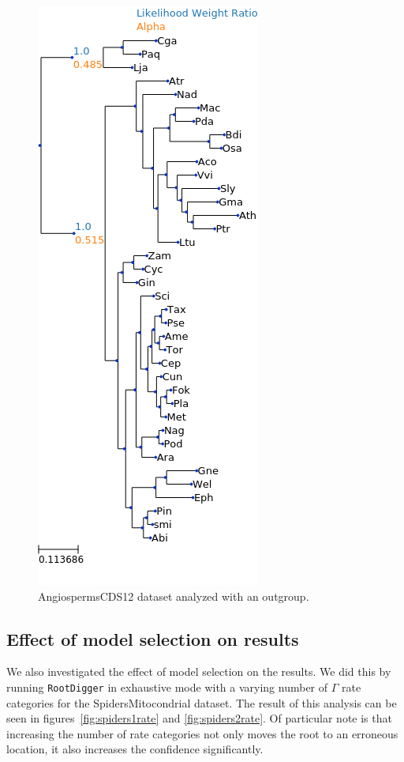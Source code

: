 \documentclass{article}
\newcommand{\RootDiggertt}{\texttt{RootDigger}}
\begin{document}
\begin{figure}
  \begin{center}
    \includegraphics[width=.5\linewidth]{figs/angio/cds12_outgroup_lwr.png}
    \caption{AngiospermsCDS12 dataset analyzed with an outgroup.}
    \label{fig:angio-cds12-outgroup}
  \end{center}
\end{figure}

\subsection{Effect of model selection on results}

We also investigated the effect of model selection on the results.
We did this by running \RootDiggertt{} in exhaustive mode with a varying number
of $\Gamma$ rate categories for the SpidersMitocondrial dataset.
The result of this analysis can be seen in figures~\ref{fig:spiders1rate} and
\ref{fig:spiders2rate}.
Of particular note is that increasing the number of rate categories not only
moves the root to an erroneous location, it also increases the confidence
significantly.
\end{document}
